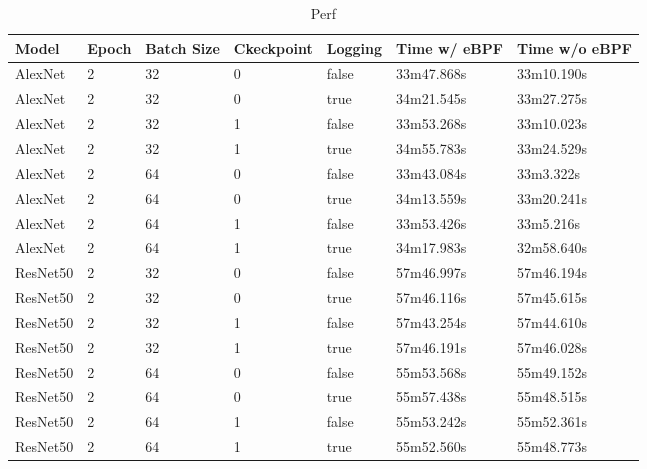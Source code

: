 \documentclass[conference]{IEEEtran}
\begin{document}
\begin{table}
    \caption{Perf}\label{tab:perf}
    \begin{center}
        \begin{tabular}[c]{|l|l|l|l|l|l|l|}
            \hline
            \rowcolor{gray}
            Model & Epoch & Batch Size & Ckeckpoint & Logging & Time w/ eBPF & Time w/o eBPF \\
            \hline
            AlexNet & 2 & 32 & 0 & false &    33m47.868s & 33m10.190s \\
            \hline
            AlexNet & 2 & 32 & 0 & true &    34m21.545s & 33m27.275s \\
            \hline
            AlexNet & 2 & 32 & 1 & false &    33m53.268s & 33m10.023s \\
            \hline
            AlexNet & 2 & 32 & 1 & true &    34m55.783s & 33m24.529s \\
            \hline
            AlexNet & 2 & 64 & 0 & false &    33m43.084s & 33m3.322s \\
            \hline
            AlexNet & 2 & 64 & 0 & true &    34m13.559s & 33m20.241s \\
            \hline
            AlexNet & 2 & 64 & 1 & false &    33m53.426s & 33m5.216s \\
            \hline
            AlexNet & 2 & 64 & 1 & true &    34m17.983s & 32m58.640s \\
            \hline
            ResNet50 & 2 & 32 & 0 & false &    57m46.997s & 57m46.194s \\
            \hline
            ResNet50 & 2 & 32 & 0 & true &     57m46.116s & 57m45.615s \\
            \hline
            ResNet50 & 2 & 32 & 1 & false &    57m43.254s & 57m44.610s \\
            \hline
            ResNet50 & 2 & 32 & 1 & true &     57m46.191s & 57m46.028s \\
            \hline
            ResNet50 & 2 & 64 & 0 & false &    55m53.568s & 55m49.152s \\
            \hline
            ResNet50 & 2 & 64 & 0 & true &     55m57.438s & 55m48.515s \\
            \hline
            ResNet50 & 2 & 64 & 1 & false &    55m53.242s & 55m52.361s \\
            \hline
            ResNet50 & 2 & 64 & 1 & true &     55m52.560s & 55m48.773s \\
            \hline
        \end{tabular}
    \end{center}
\end{table}
\end{document}
